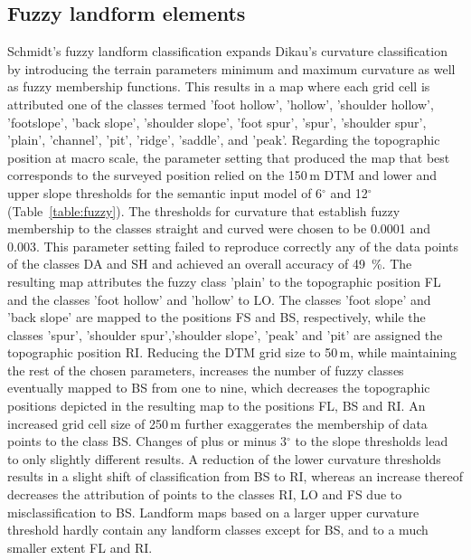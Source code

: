 \documentclass[preprint,12pt,authoryear]{elsarticle}
\begin{document}
\subsection{Fuzzy landform elements}
Schmidt's fuzzy landform classification expands Dikau's curvature classification by introducing the terrain parameters minimum and maximum curvature as well as fuzzy membership functions. This results in a map where each grid cell is attributed one of the classes termed 'foot hollow', 'hollow', 'shoulder hollow', 'footslope', 'back slope', 'shoulder slope', 'foot spur', 'spur', 'shoulder spur', 'plain', 'channel', 'pit', 'ridge', 'saddle', and 'peak'.
Regarding the topographic position at macro scale, the parameter setting that produced the map that best corresponds to the surveyed position relied on the 150\,m DTM and lower and upper slope thresholds for the semantic input model of 6$^{\circ}$ and 12$^{\circ}$ (Table~\ref{table:fuzzy}). The thresholds for curvature that establish fuzzy membership to the classes straight and curved were chosen to be 0.0001 and 0.003. This parameter setting failed to reproduce correctly any of the data points of the classes DA and SH and achieved an overall accuracy of 49~\%. The resulting map attributes the fuzzy class 'plain' to the topographic position FL and the classes 'foot hollow' and 'hollow' to LO. The classes 'foot slope' and 'back slope' are mapped to the positions FS and BS, respectively, while the classes 'spur', 'shoulder spur','shoulder slope', 'peak' and 'pit' are assigned the topographic position RI. Reducing the DTM grid size to 50\,m, while maintaining the rest of the chosen parameters, increases the number of fuzzy classes eventually mapped to BS from one to nine, which decreases the topographic positions depicted in the resulting map to the positions FL, BS and RI. An increased grid cell size of 250\,m further exaggerates the membership of data points to the class BS. Changes of plus or minus 3$^{\circ}$ to the slope thresholds lead to only slightly different results. A reduction of the lower curvature thresholds results in a slight shift of classification from BS to RI, whereas an increase thereof decreases the attribution of points to the classes RI, LO and FS due to misclassification to BS. Landform maps based on a larger upper curvature threshold hardly contain any landform classes except for BS, and to a much smaller extent FL and RI.
\end{document}
